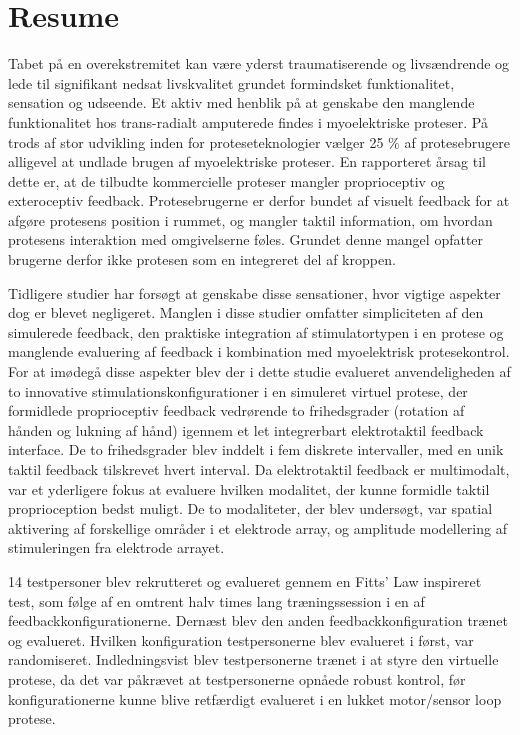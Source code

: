 \section*{Resume}

Tabet på en overekstremitet kan være yderst traumatiserende og livsændrende og lede til signifikant nedsat livskvalitet grundet formindsket funktionalitet, sensation og udseende. Et aktiv med henblik på at genskabe den manglende funktionalitet hos trans-radialt amputerede findes i myoelektriske proteser. På trods af stor udvikling inden for proteseteknologier vælger 25 \% af protesebrugere alligevel at undlade brugen af myoelektriske proteser. En rapporteret årsag til dette er, at de tilbudte kommercielle proteser mangler proprioceptiv og exteroceptiv feedback. Protesebrugerne er derfor bundet af visuelt feedback for at afgøre protesens position i rummet, og mangler taktil information, om hvordan protesens interaktion med omgivelserne føles. Grundet denne mangel opfatter brugerne derfor ikke protesen som en integreret del af kroppen. 

Tidligere studier har forsøgt at genskabe disse sensationer, hvor vigtige aspekter dog er blevet negligeret. Manglen i disse studier omfatter simpliciteten af den simulerede feedback, den praktiske integration af stimulatortypen i en protese og manglende evaluering af feedback i kombination med myoelektrisk protesekontrol. For at imødegå disse aspekter blev der i dette studie evalueret anvendeligheden af to innovative stimulationskonfigurationer i en simuleret virtuel protese, der formidlede proprioceptiv feedback vedrørende to frihedsgrader (rotation af hånden og lukning af hånd) igennem et let integrerbart elektrotaktil feedback interface. De to frihedsgrader blev inddelt i fem diskrete intervaller, med en unik taktil feedback tilskrevet hvert interval. Da elektrotaktil feedback er multimodalt, var et yderligere fokus at evaluere hvilken modalitet, der kunne formidle taktil proprioception bedst muligt. De to modaliteter, der blev undersøgt, var spatial aktivering af forskellige områder i et elektrode array, og amplitude modellering af stimuleringen fra elektrode arrayet. 

14 testpersoner blev rekrutteret og evalueret gennem en Fitts’ Law inspireret test, som følge af en omtrent halv times lang træningssession i en af feedbackkonfigurationerne. Dernæst blev den anden feedbackkonfiguration trænet og evalueret. Hvilken konfiguration testpersonerne blev evalueret i først, var randomiseret. Indledningsvist blev testpersonerne trænet i at styre den virtuelle protese, da det var påkrævet at testpersonerne opnåede robust kontrol, før konfigurationerne kunne blive retfærdigt evalueret i en lukket motor/sensor loop protese.

